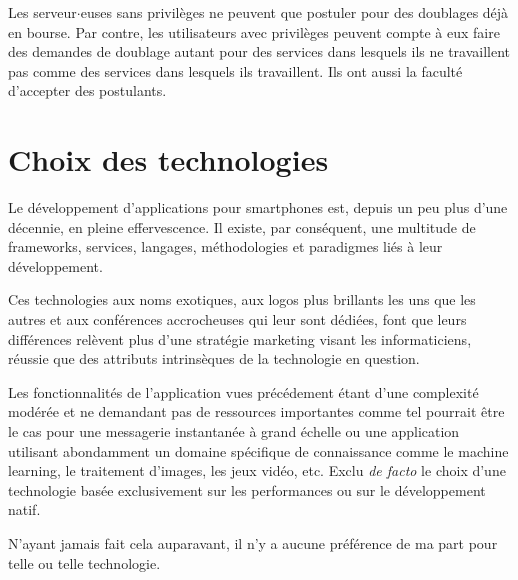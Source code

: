 Les serveur$\cdot$euses sans privilèges ne peuvent que postuler pour des doublages déjà en bourse. Par contre, les utilisateurs avec privilèges peuvent compte à eux faire des demandes de doublage autant pour des services dans lesquels ils ne travaillent pas comme des services dans lesquels ils travaillent. Ils ont aussi la faculté d'accepter des postulants.

\section{Choix des technologies}
Le développement d'applications
pour smartphones est, depuis un peu plus d'une décennie, en pleine effervescence. Il existe, par
conséquent, une multitude de frameworks, services, langages, méthodologies et paradigmes liés à leur
développement.

Ces technologies aux noms exotiques, aux logos plus brillants les uns que les autres et aux
conférences accrocheuses qui leur sont dédiées, font que leurs différences relèvent plus
d'une stratégie marketing visant les informaticiens, réussie que des attributs
intrinsèques de la technologie en question.

Les fonctionnalités de l'application vues précédement étant d'une complexité modérée et ne demandant pas de ressources importantes
comme tel pourrait être le cas pour une messagerie instantanée à grand échelle ou une application
utilisant abondamment un domaine spécifique de connaissance comme le machine learning, le traitement d'images, les jeux vidéo, etc.
Exclu \textit{de facto} le choix d'une technologie basée exclusivement sur les performances ou sur le développement natif.

N'ayant jamais fait cela auparavant, il n'y a aucune préférence de ma part pour telle ou telle technologie.

